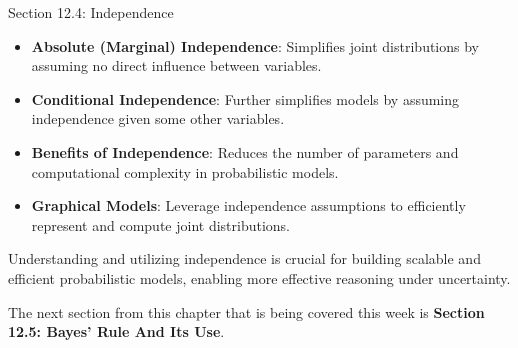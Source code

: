\begin{notes}{Section 12.4: Independence}
\begin{highlight}
    \end{highlight}
    
    \begin{highlight}
    
        \begin{itemize}
            \item \textbf{Absolute (Marginal) Independence}: Simplifies joint distributions by assuming no direct influence between variables.
            \item \textbf{Conditional Independence}: Further simplifies models by assuming independence given some other variables.
            \item \textbf{Benefits of Independence}: Reduces the number of parameters and computational complexity in probabilistic models.
            \item \textbf{Graphical Models}: Leverage independence assumptions to efficiently represent and compute joint distributions.
        \end{itemize}
    
        Understanding and utilizing independence is crucial for building scalable and efficient probabilistic models, enabling more effective reasoning under uncertainty.
    
    \end{highlight}
\end{notes}

The next section from this chapter that is being covered this week is \textbf{Section 12.5: Bayes' Rule And Its Use}.

